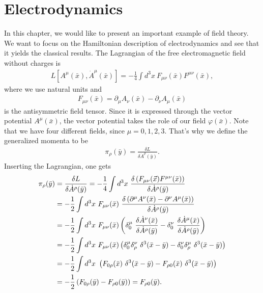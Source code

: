 \chapter{Electrodynamics}
In this chapter, we would like to present an important example of field theory. We want to focus on the Hamiltonian description of electrodynamics and see that it yields the classical results. The Lagrangian of the free electromagnetic field without charges is
\begin{align}
L[A^{\mu}(\bar{x}), \dot{A}^{\mu}(\bar{x})]  = - \frac{1}{4} \displaystyle\int d^3 x \ F_{\mu \nu}(\bar{x}) F^{\mu \nu}(\bar{x}),
\end{align}
where we use natural units and
\begin{align}
F_{\mu \nu}(\bar{x}) = \partial_{\mu} A_{\nu}(\bar{x}) - \partial_{\nu} A_{\mu}(\bar{x})
\end{align}
is the antisymmetric field tensor. Since it is expressed through the vector potential $A^{\mu}(\bar{x})$, the vector potential takes the role of our field $\varphi(\bar{x})$. Note that we have four different fields, since $\mu = 0,1,2,3$.
That's why we define the generalized momenta to be
\begin{align}
\pi_{\rho}(\bar{y}) = \frac{\delta L}{\delta \dot{A}^{\rho}(\bar{y})}.
\end{align}
Inserting the Lagrangian, one gets
\begin{align}
\pi_{\rho}(\bar{y}) &= \frac{\delta L}{\delta \dot{A}^{\rho}(\bar{y})} = - \frac{1}{4} \int d^3 x \ \frac{\delta \left( F_{\mu \nu}(\vec{x}) F^{\mu \nu}(\bar{x}) \right)}{\delta \dot{A}^{\rho}(\bar{y})} \notag \\
&= - \frac{1}{2} \int d^3 x \ F_{\mu \nu}(\bar{x}) \ \frac{\delta \left(\partial^{\mu} A^{\nu}(\bar{x}) - \partial^{\nu} A^{\mu}(\bar{x}) \right)}{\delta \dot{A}^{\rho}(\bar{y})} \notag \\
&= - \frac{1}{2} \int d^3 x \ F_{\mu \nu}(\bar{x}) \left( \delta_0^{\mu} \ \frac{\delta \dot{A}^{\nu}(\bar{x})}{\delta \dot{A}^{\rho}(\bar{y})} - \delta_0^{\nu} \ \frac{\delta \dot{A}^{\mu}(\bar{x})}{\delta \dot{A}^{\rho}(\bar{y})} \right) \notag \\
&= - \frac{1}{2} \int d^3 x \ F_{\mu \nu}(\bar{x}) \left( \delta_0^{\mu} \delta_{\rho}^{\nu} \ \delta^3(\bar{x} - \bar{y}) - \delta_0^{\nu} \delta_{\rho}^{\mu} \ \delta^3(\bar{x} - \bar{y}) \right) \notag \\
&= - \frac{1}{2} \int d^3 x \ \left( F_{0 \rho}(\bar{x}) \ \delta^3(\bar{x} - \bar{y}) - F_{\rho 0}(\bar{x}) \ \delta^3(\bar{x} - \bar{y}) \right) \notag \\
&= - \frac{1}{2} \left( F_{0 \rho}(\bar{y}) - F_{\rho 0}(\bar{y}) \right) = F_{\rho 0}(\bar{y}) .
\end{align}
